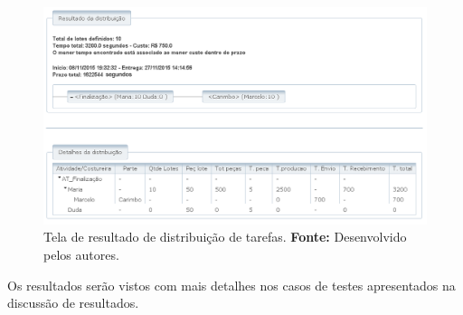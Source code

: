 \begin{figure}[h!]
	\centerline{\includegraphics[width=14cm]{./imagens/resultado_distribuicao.png}}
	\caption[Tela de resultado de distribuição de tarefas.]
	{Tela de resultado de distribuição de tarefas.
		\textbf{Fonte:} Desenvolvido pelos autores.}
	\label{fig:tela_dis_result}
\end{figure}

\par Os resultados serão vistos com mais detalhes nos casos de testes apresentados na discussão de resultados.
